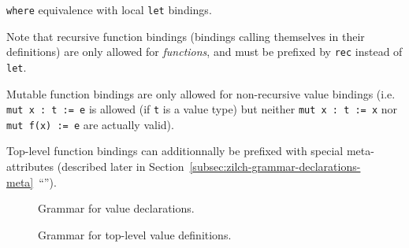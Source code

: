 \begin{listing}[H]
	\inputminted{\zilchlexer}{examples/function-where-let-equivalence.zc}

	\captionsetup{style=invisible}
	\caption{\texttt{where} equivalence with local \texttt{let} bindings.}
\end{listing}
\vspace*{-\baselineskip}

Note that recursive function bindings (bindings calling themselves in their definitions) are only allowed for \textit{functions}, and must be prefixed by \verb|rec| instead of \verb|let|.

Mutable function bindings are only allowed for non-recursive value bindings (i.e. \texttt{mut x : t := e} is allowed (if \verb|t| is a value type) but neither \texttt{mut x : t := x} nor \texttt{mut f(x) := e} are actually valid).

Top-level function bindings can additionnally be prefixed with special meta-attributes (described later in Section~\ref{subsec:zilch-grammar-declarations-meta}~``'').

\begin{figure}[H]
	\centering


	\caption{Grammar for value declarations.}
	\label{fig:zilch-grammar-declarations-value-grammar}
\end{figure}

\begin{figure}[H]
	\centering


	\caption{Grammar for top-level value definitions.}
	\label{fig:zilch-grammar-declarations-value-toplevel-grammar}
\end{figure}

